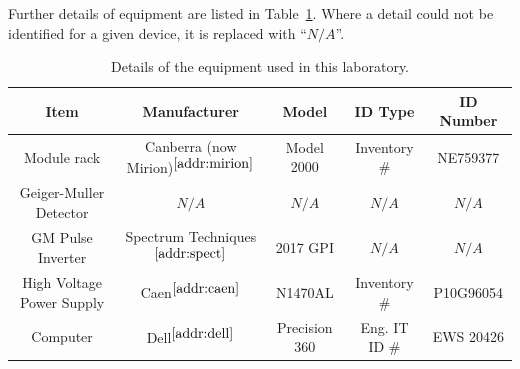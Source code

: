 \documentclass[12pt]{article}
\newcommand{\micCi}{\xspace$\mathrm{\mu Ci}$\xspace}
\begin{document}
\newcommand{\na}{$N/A$}
\newcommand{\sref}[1]{$^{\ref{#1}}$}
\FloatBarrier
Further details of equipment are listed in Table~\ref{tab:equip}.
Where a detail could not be identified for a given device, it is replaced with ``\na''.
\begin{table}[!h]
    \centering
    \small
    \caption{Details of the equipment used in this laboratory.}
    \label{tab:equip}
    \scriptsize
    \begin{tabular}{c|cccc}
        Item & Manufacturer & Model & ID Type & ID Number\\\hline
        Module rack & Canberra (now Mirion)\sref{addr:mirion}& Model 2000 & Inventory \# & NE759377 \\
        Geiger-Muller Detector & \na & \na & \na & \na \\
        GM Pulse Inverter & Spectrum Techniques\sref{addr:spect} & 2017 GPI & \na & \na \\
        High Voltage Power Supply & Caen\sref{addr:caen} & N1470AL & Inventory \# & P10G96054 \\
        Computer & Dell\sref{addr:dell} & Precision 360 & Eng. IT ID \# & EWS 20426 \\


\end{tabular}
\end{table}
\end{document}
